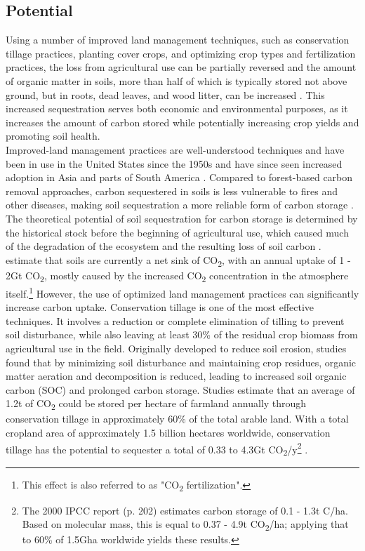 \subsection*{Potential}
Using a number of improved land management techniques, such as conservation tillage practices, planting cover crops, and optimizing crop types and fertilization practices, the loss from agricultural use can be partially reversed and the amount of organic matter in soils, more than half of which is typically stored not above ground, but in roots, dead leaves, and wood litter, can be increased \parencite[192]{Ontl2012SoilStorage,Watson2000LandForestry}. This increased sequestration serves both economic and environmental purposes, as it increases the amount of carbon stored while potentially increasing crop yields and promoting soil health. \parencite{Dipple2021TheSystems}\\
Improved-land management practices are well-understood techniques and have been in use in the United States since the 1950s and have since seen increased adoption in Asia and parts of South America \parencite[202]{Watson2000LandForestry}. Compared to forest-based carbon removal approaches, carbon sequestered in soils is less vulnerable to fires and other diseases, making soil sequestration a more reliable form of carbon storage \parencite{Dipple2021TheSystems}. The theoretical potential of soil sequestration for carbon storage is determined by the historical stock before the beginning of agricultural use, which caused much of the degradation of the ecosystem and the resulting loss of soil carbon \parencite{NAS2018NegativeAgenda}.
\textcite{Dipple2021TheSystems} estimate that soils are currently a net sink of CO\textsubscript{2}, with an annual uptake of 1 - 2Gt CO\textsubscript{2}, mostly caused by the increased CO\textsubscript{2} concentration in the atmosphere itself.\footnote{This effect is also referred to as "CO\textsubscript{2} fertilization".}
However, the use of optimized land management practices can significantly increase carbon uptake. Conservation tillage is one of the most effective techniques. It involves a reduction or complete elimination of tilling to prevent soil disturbance, while also leaving at least 30\% of the residual crop biomass from agricultural use in the field. Originally developed to reduce soil erosion, studies found that by minimizing soil disturbance and maintaining crop residues, organic matter aeration and decomposition is reduced, leading to increased soil organic carbon (SOC) and prolonged carbon storage. Studies estimate that an average of 1.2t of CO\textsubscript{2} could be stored per hectare of farmland annually through conservation tillage in approximately 60\% of the total arable land. With a total cropland area of approximately 1.5 billion hectares worldwide, conservation tillage has the potential to sequester a total of 0.33 to 4.3Gt CO\textsubscript{2}/y\footnote{The 2000 IPCC report (p. 202) estimates carbon storage of 0.1 - 1.3t C/ha. Based on molecular mass, this is equal to 0.37 - 4.9t CO\textsubscript{2}/ha; applying that to 60\% of 1.5Gha worldwide yields these results.} \parencite{NRC2015ClimateSequestration, Watson2000LandForestry}.
